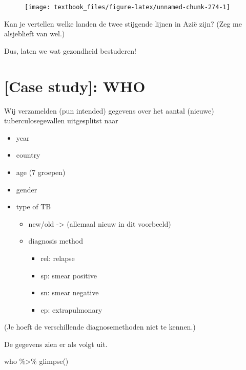 \documentclass[]{tufte-book}
\newenvironment{Shaded}{}{}
\newcommand{\FunctionTok}[1]{\textcolor[rgb]{0.02,0.16,0.49}{#1}}
\newcommand{\NormalTok}[1]{#1}
\newcommand{\SpecialCharTok}[1]{\textcolor[rgb]{0.25,0.44,0.63}{#1}}
\providecommand{\tightlist}{%
  \setlength{\itemsep}{0pt}\setlength{\parskip}{0pt}}
\begin{document}
\begin{figure}
\texttt{[image: textbook\_files/figure-latex/unnamed-chunk-274-1]} \end{figure}

Kan je vertellen welke landen de twee stijgende lijnen in Azië zijn? (Zeg me alsjeblieft van wel.)

Dus, laten we wat gezondheid bestuderen!

\hypertarget{case-study-who}{%
\section{{[}Case study{]}: WHO}\label{case-study-who}}

Wij verzamelden (pun intended) gegevens over het aantal (nieuwe) tuberculosegevallen uitgesplitst naar

\begin{itemize}
\tightlist
\item
  year
\item
  country
\item
  age (7 groepen)
\item
  gender
\item
  type of TB

  \begin{itemize}
  \tightlist
  \item
    new/old -\textgreater{} (allemaal nieuw in dit voorbeeld)
  \item
    diagnosis method

    \begin{itemize}
    \tightlist
    \item
      rel: relapse
    \item
      sp: smear positive
    \item
      sn: smear negative
    \item
      ep: extrapulmonary
    \end{itemize}
  \end{itemize}
\end{itemize}

(Je hoeft de verschillende diagnosemethoden niet te kennen.)

De gegevens zien er als volgt uit.

\begin{Shaded}
\begin{Highlighting}[]
\NormalTok{who }\SpecialCharTok{\%\textgreater{}\%}
  \FunctionTok{glimpse}\NormalTok{()}
\end{Highlighting}
\end{Shaded}
\end{document}
